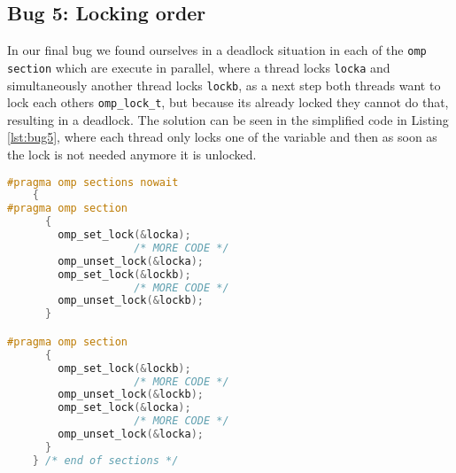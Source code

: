 \subsection{Bug 5: Locking order}
In our final bug we found ourselves in a deadlock situation in each of the \texttt{omp section} which are execute in parallel, where a thread locks \texttt{locka} and simultaneously another thread locks \texttt{lockb}, as a next step both threads want to lock each others \texttt{omp\_lock\_t}, but because its already locked they cannot do that, resulting in a deadlock. The solution can be seen in the simplified code in Listing \ref{lst:bug5}, where each thread only locks one of the variable and then as soon as the lock is not needed anymore it is unlocked.
\begin{lstlisting}[language=C++, caption=Non-Deadlock fix for omp\_bug-5.c, label=lst:bug5]
#pragma omp sections nowait
    {
#pragma omp section
      {
        omp_set_lock(&locka);
					/* MORE CODE */
        omp_unset_lock(&locka);
        omp_set_lock(&lockb);
					/* MORE CODE */
        omp_unset_lock(&lockb);
      }

#pragma omp section
      {
        omp_set_lock(&lockb);
					/* MORE CODE */
        omp_unset_lock(&lockb);
        omp_set_lock(&locka);
					/* MORE CODE */
        omp_unset_lock(&locka);
      }
    } /* end of sections */
\end{lstlisting}

